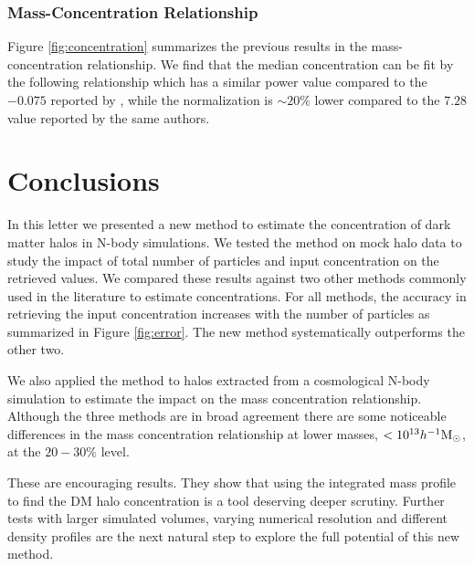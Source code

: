 \documentclass[a4,useAMS,usenatbib,usegraphicx]{mn2e}
\newcommand{\hMsun}{{\ifmmode{h^{-1}{\rm {M_{\odot}}}}\else{$h^{-1}{\rm{M_{\odot}}}$}\fi}}
\begin{document}
\subsubsection{Mass-Concentration Relationship}


Figure \ref{fig:concentration} summarizes the previous results in the
mass-concentration relationship. 
We find that the median concentration
can be fit by the following relationship
%
which has a similar power value compared to the $-0.075$ reported by
\citep{Prada2012}, while the normalization is $\sim 20\%$ lower
compared to the $7.28$ value reported by the same authors. 



\section{Conclusions}
\label{sec:conclusions}

In this letter we presented a new method to estimate the concentration
of dark matter halos in N-body simulations.  
We tested the method on mock halo data to study the impact of total
number of particles and input concentration on the retrieved values.  
We compared these results against two other methods commonly used in
the literature to estimate concentrations.  
For all methods, the accuracy in retrieving the input concentration
increases with the number of particles as summarized in Figure
\ref{fig:error}.  The new method systematically outperforms the other two.

We also applied the method to halos extracted from a cosmological
N-body simulation to estimate the impact on the mass concentration
relationship. Although the three  methods are in broad agreement there
are some noticeable differences in the mass concentration relationship
at lower masses, $<10^{13}\hMsun$, at the $20-30\%$ level.

These are encouraging results. They show that using the integrated
mass profile to find the DM halo concentration is a tool deserving
deeper scrutiny. Further tests with larger simulated volumes, varying
numerical resolution and different density profiles are
the next natural step to explore the full potential of this
new method. 

\vspace{0.5cm}
\end{document}
